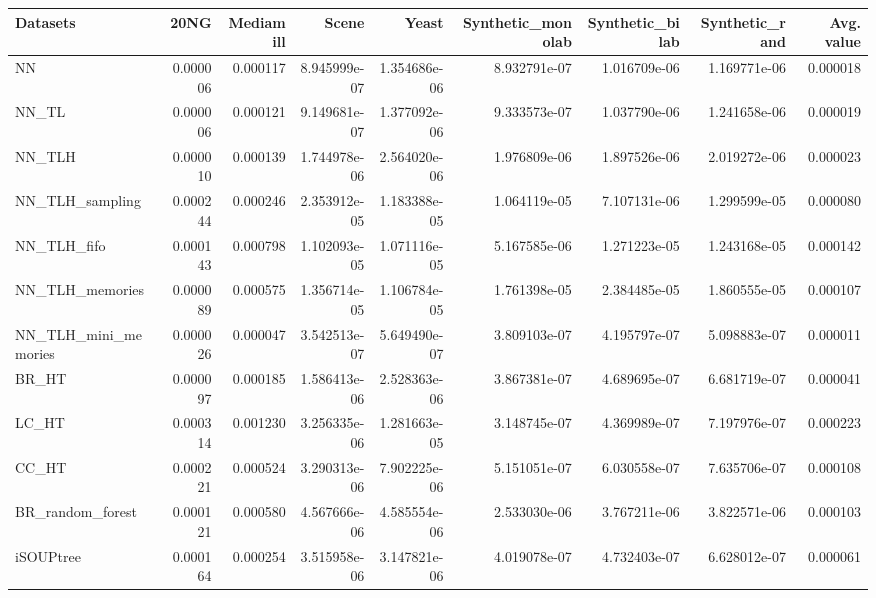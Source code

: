 \begin{tabular}{lrrrrrrrr}
\toprule
Datasets &      20NG &  Mediamill &         Scene &         Yeast &  Synthetic\_monolab &  Synthetic\_bilab &  Synthetic\_rand &  Avg. value \\
\midrule
NN                   &  0.000006 &   0.000117 &  8.945999e-07 &  1.354686e-06 &       8.932791e-07 &     1.016709e-06 &    1.169771e-06 &    0.000018 \\
NN\_TL                &  0.000006 &   0.000121 &  9.149681e-07 &  1.377092e-06 &       9.333573e-07 &     1.037790e-06 &    1.241658e-06 &    0.000019 \\
NN\_TLH               &  0.000010 &   0.000139 &  1.744978e-06 &  2.564020e-06 &       1.976809e-06 &     1.897526e-06 &    2.019272e-06 &    0.000023 \\
NN\_TLH\_sampling      &  0.000244 &   0.000246 &  2.353912e-05 &  1.183388e-05 &       1.064119e-05 &     7.107131e-06 &    1.299599e-05 &    0.000080 \\
NN\_TLH\_fifo          &  0.000143 &   0.000798 &  1.102093e-05 &  1.071116e-05 &       5.167585e-06 &     1.271223e-05 &    1.243168e-05 &    0.000142 \\
NN\_TLH\_memories      &  0.000089 &   0.000575 &  1.356714e-05 &  1.106784e-05 &       1.761398e-05 &     2.384485e-05 &    1.860555e-05 &    0.000107 \\
NN\_TLH\_mini\_memories &  0.000026 &   0.000047 &  3.542513e-07 &  5.649490e-07 &       3.809103e-07 &     4.195797e-07 &    5.098883e-07 &    0.000011 \\
BR\_HT                &  0.000097 &   0.000185 &  1.586413e-06 &  2.528363e-06 &       3.867381e-07 &     4.689695e-07 &    6.681719e-07 &    0.000041 \\
LC\_HT                &  0.000314 &   0.001230 &  3.256335e-06 &  1.281663e-05 &       3.148745e-07 &     4.369989e-07 &    7.197976e-07 &    0.000223 \\
CC\_HT                &  0.000221 &   0.000524 &  3.290313e-06 &  7.902225e-06 &       5.151051e-07 &     6.030558e-07 &    7.635706e-07 &    0.000108 \\
BR\_random\_forest     &  0.000121 &   0.000580 &  4.567666e-06 &  4.585554e-06 &       2.533030e-06 &     3.767211e-06 &    3.822571e-06 &    0.000103 \\
iSOUPtree            &  0.000164 &   0.000254 &  3.515958e-06 &  3.147821e-06 &       4.019078e-07 &     4.732403e-07 &    6.628012e-07 &    0.000061 \\
\bottomrule
\end{tabular}

